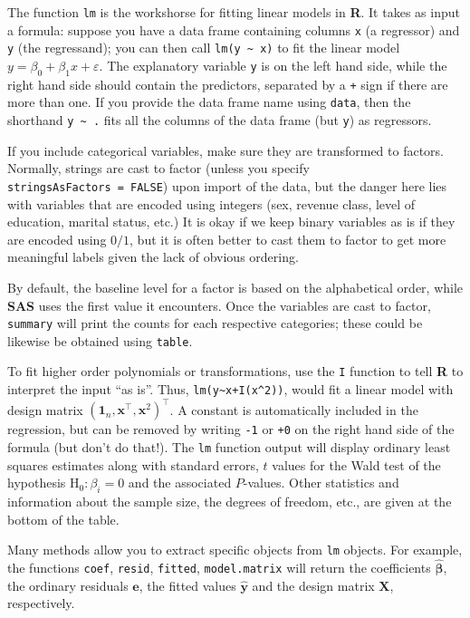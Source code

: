 \documentclass[
  11pt,
  letterpaper,
]{book}
\theoremstyle{definition}
\theoremstyle{definition}
\theoremstyle{definition}
\theoremstyle{remark}
\begin{document}
The function \texttt{lm} is the workshorse for fitting linear models in \textbf{R}. It takes as input a formula: suppose you have a data frame containing columns \texttt{x} (a regressor) and \texttt{y} (the regressand); you can then call \texttt{lm(y\ \textasciitilde{}\ x)} to fit the linear model \(y = \beta_0 + \beta_1 x + \varepsilon\). The explanatory variable \texttt{y} is on the left hand side,
while the right hand side should contain the predictors, separated by a \texttt{+} sign if there are more than one.
If you provide the data frame name using \texttt{data}, then the shorthand \texttt{y\ \textasciitilde{}\ .} fits all the columns of the data frame (but \texttt{y}) as regressors.

If you include categorical variables, make sure they are transformed to factors. Normally, strings are cast to factor (unless you specify \texttt{stringsAsFactors\ =\ FALSE}) upon import of the data, but the danger here lies with variables that are encoded using integers (sex, revenue class, level of education, marital status, etc.) It is okay if we keep binary variables as is if they are encoded using \(0/1\), but it is often better to cast them to factor to get more meaningful labels given the lack of obvious ordering.

By default, the baseline level for a factor is based on the alphabetical order, while \textbf{SAS} uses the first value it encounters. Once the variables are cast to factor, \texttt{summary} will print the counts for each respective categories; these could be likewise be obtained using \texttt{table}.

To fit higher order polynomials or transformations, use the \texttt{I} function to tell \textbf{R} to interpret the input ``as is''.
Thus, \texttt{lm(y\textasciitilde{}x+I(x\^{}2))}, would fit a linear model with design matrix \((\boldsymbol{1}_n, \mathbf{x}^\top, \mathbf{x}^2)^\top\). A constant is automatically included in the regression, but can be removed by writing \texttt{-1} or \texttt{+0} on the right hand side of the formula (but don't do that!). The \texttt{lm} function output will display ordinary least squares estimates along with standard errors, \(t\) values for the Wald test of the hypothesis \(\mathrm{H}_0: \beta_i=0\) and the associated \(P\)-values. Other statistics and information about the sample size, the degrees of freedom, etc., are given at the bottom of the table.

Many methods allow you to extract specific objects from \texttt{lm} objects. For example, the functions \texttt{coef}, \texttt{resid}, \texttt{fitted}, \texttt{model.matrix} will return the coefficients \(\widehat{\boldsymbol{\beta}}\), the ordinary residuals \(\boldsymbol{e}\), the fitted values \(\widehat{\boldsymbol{y}}\) and the design matrix \(\mathbf{X}\), respectively.
\end{document}
